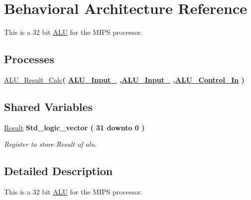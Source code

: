 \hypertarget{class_a_l_u_1_1_behavioral}{\section{\-Behavioral \-Architecture \-Reference}
\label{class_a_l_u_1_1_behavioral}
}


\-This is a 32 bit \hyperlink{class_a_l_u}{\-A\-L\-U} for the \-M\-I\-P\-S processor.  


\*
\*
\subsection*{\-Processes}
 \begin{DoxyCompactItemize}
\item 
\hypertarget{class_a_l_u_1_1_behavioral_a9d398c4f01ad1a21234856b1403845fc}{\hyperlink{class_a_l_u_1_1_behavioral_a9d398c4f01ad1a21234856b1403845fc}{\-A\-L\-U\-\_\-\-Result\-\_\-\-Calc}{\bfseries  ( {\bfseries {\bfseries \hyperlink{class_a_l_u_ad506dc3c4d5a49b33075dcf2ea057306}{\-A\-L\-U\-\_\-\-Input\-\_}}   ,{\bfseries \hyperlink{class_a_l_u_a657f38dca67063612c1c3d9327260efd}{\-A\-L\-U\-\_\-\-Input\-\_}}  ,{\bfseries \hyperlink{class_a_l_u_a160e9acd866b7a383a28d77c159bd52a}{\-A\-L\-U\-\_\-\-Control\-\_\-\-In}}  } )}}\label{class_a_l_u_1_1_behavioral_a9d398c4f01ad1a21234856b1403845fc}

\end{DoxyCompactItemize}
\subsection*{\-Shared \-Variables}
 \begin{DoxyCompactItemize}
\item 
\hypertarget{class_a_l_u_1_1_behavioral_afc4b6c182f9d7ec900d031c30ae7fd43}{\hyperlink{class_a_l_u_1_1_behavioral_afc4b6c182f9d7ec900d031c30ae7fd43}{\-Result} {\bfseries \-Std\-\_\-logic\-\_\-vector (   31    downto    0  ) } }\label{class_a_l_u_1_1_behavioral_afc4b6c182f9d7ec900d031c30ae7fd43}

\begin{DoxyCompactList}\small\item\em \-Register to store \-Result of alu. \end{DoxyCompactList}\end{DoxyCompactItemize}


\subsection{\-Detailed \-Description}
\-This is a 32 bit \hyperlink{class_a_l_u}{\-A\-L\-U} for the \-M\-I\-P\-S processor. 

